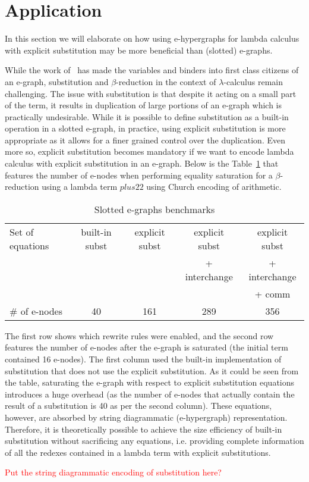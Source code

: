 \section{Application}

In this section we will elaborate on how using e-hypergraphs for lambda calculus with explicit substitution may be more beneficial than (slotted) e-graphs.


While the work of~\cite{slotted-egraphs} has made the variables and binders into first class citizens of an e-graph, substitution and $\beta$-reduction in the context of $\lambda$-calculus remain challenging.
The issue with substitution is that despite it acting on a small part of the term, it results in duplication of large portions of an e-graph which is practically undesirable.
While it is possible to define substitution as a built-in operation in a slotted e-graph, in practice, using explicit substitution is more appropriate as it allows for a finer grained control over the duplication.
Even more so, explicit substitution becomes mandatory if we want to encode lambda calculus with explicit substitution in an e-graph.
Below is the Table~\ref{tbl:slotted} that features the number of e-nodes when performing equality saturation for a $\beta$-reduction using a lambda term $plus 2 2$ using Church encoding of arithmetic.

\begin{table}
    \begin{tabular}{lcccc}
      Set of equations & built-in subst & explicit subst & explicit subst & explicit subst\\
      &&& + interchange&  + interchange\\
      &&&&  + comm\\
      \# of e-nodes & 40 & 161 & 289 & 356
    \end{tabular}
    \caption{Slotted e-graphs benchmarks}
    \label{tbl:slotted}
\end{table}

The first row shows which rewrite rules were enabled, and the second row features the number of e-nodes after the e-graph is saturated (the initial term contained 16 e-nodes).
The first column used the built-in implementation of substitution that does not use the explicit substitution.
As it could be seen from the table, saturating the e-graph with respect to explicit substitution equations introduces a huge overhead (as the number of e-nodes that actually contain the result of a substitution is 40 as per the second column).
These equations, however, are absorbed by string diagrammatic (e-hypergraph) representation. Therefore, it is theoretically possible to achieve the size efficiency of built-in substitution without sacrificing any equations, i.e. providing complete information of all the redexes contained in a lambda term with explicit substitutions.

\textcolor{red}{Put the string diagrammatic encoding of substitution here?}